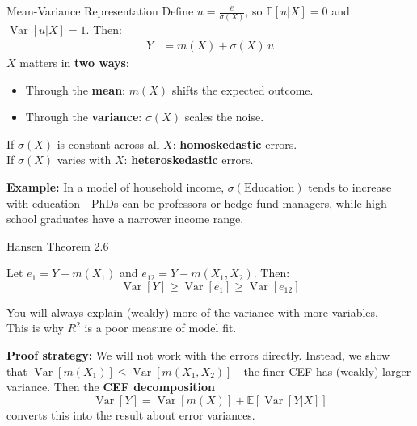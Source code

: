 \documentclass[aspectratio=169, handout, t]{beamer}
\numberwithin{equation}{section}
\begin{document}
\begin{frame}{Mean-Variance Representation}
Define $u=\frac{e}{\sigma(X)}$, so $\mathbb{E}[u|X]=0$ and $\operatorname{Var}[u|X]=1$.  Then:
\begin{align*}
Y&=m(X)+\sigma(X)\, u
\end{align*}
\pause
$X$ matters in \textbf{two ways}:
\begin{itemize}
\item Through the \textbf{mean}: $m(X)$ shifts the expected outcome.
\item Through the \textbf{variance}: $\sigma(X)$ scales the noise.
\end{itemize}

\bigskip\pause
If $\sigma(X)$ is constant across all $X$: \textbf{homoskedastic} errors.\\
If $\sigma(X)$ varies with $X$: \textbf{heteroskedastic} errors.

\bigskip\pause
\textbf{Example:} In a model of household income, $\sigma(\text{Education})$ tends to increase with education---PhDs can be professors or hedge fund managers, while high-school graduates have a narrower income range.
\end{frame}


\begin{frame}{Hansen Theorem 2.6}
\begin{tcolorbox}[colback=blue!5, colframe=blue!50, title=Theorem 2.6 (More Variables Reduce Error Variance)]
Let $e_1=Y-m(X_1)$ and $e_{12}=Y-m(X_1, X_2)$.  Then:
$$\operatorname{Var}[Y]\geq \operatorname{Var}[e_1]\geq \operatorname{Var}[e_{12}]$$
\end{tcolorbox}
\medskip
You will always explain (weakly) more of the variance with more variables.\\
This is why $R^2$ is a poor measure of model fit.

\medskip\pause
\textbf{Proof strategy:} We will not work with the errors directly.  Instead, we show that $\operatorname{Var}[m(X_1)] \leq \operatorname{Var}[m(X_1,X_2)]$---the finer CEF has (weakly) larger variance.  Then the \textbf{CEF decomposition}
$$\operatorname{Var}[Y] = \operatorname{Var}[m(X)] + \mathbb{E}[\operatorname{Var}[Y|X]]$$
converts this into the result about error variances.
\end{frame}
\end{document}
